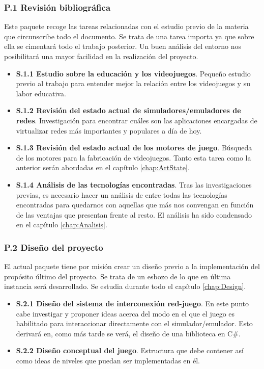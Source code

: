 \subsubsection{P.1 Revisión bibliográfica}
Este paquete recoge las tareas relacionadas con el estudio previo de la materia que circunscribe todo el documento. Se trata de una tarea importa ya que sobre ella se cimentará todo el trabajo posterior. Un buen análisis del entorno nos posibilitará una mayor facilidad en la realización del proyecto.
\begin{itemize}
\item \textbf{S.1.1 Estudio sobre la educación y los videojuegos}. Pequeño estudio previo al trabajo para entender mejor la relación entre los videojuegos y su labor educativa.
\item \textbf{S.1.2 Revisión del estado actual de simuladores/emuladores de redes}. Investigación para encontrar cuáles son las aplicaciones encargadas de virtualizar redes más importantes y populares a día de hoy.
\item \textbf{S.1.3 Revisión del estado actual de los motores de juego}. Búsqueda de los motores para la fabricación de videojuegos. Tanto esta tarea como la anterior serán abordadas en el capítulo \ref{chap:ArtState}.
\item \textbf{S.1.4 Análisis de las tecnologías encontradas}. Tras las investigaciones previas, es necesario hacer un análisis de entre todas las tecnologías encontradas para quedarnos con aquellas que más nos convengan en función de las ventajas que presentan frente al resto. El análisis ha sido condensado en el capítulo \ref{chap:Analisis}.
\end{itemize}

\subsubsection{P.2 Diseño del proyecto}
El actual paquete tiene por misión crear un diseño previo a la implementación del propósito último del proyecto. Se trata de un esbozo de lo que en última instancia será desarrollado. Se estudia durante todo el capítulo \ref{chap:Design}.
\begin{itemize}
\item \textbf{S.2.1 Diseño del sistema de interconexión red-juego}. En este punto cabe investigar y proponer ideas acerca del modo en el que el juego es habilitado para interaccionar directamente con el simulador/emulador. Esto derivará en, como más tarde se verá, el diseño de una biblioteca en C\#.
\item \textbf{S.2.2 Diseño conceptual del juego}. Estructura que debe contener así como ideas de niveles que puedan ser implementadas en él.
\end{itemize}

